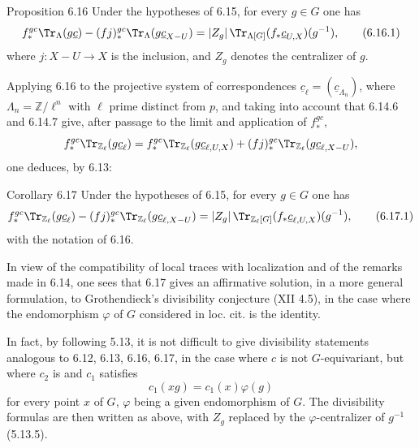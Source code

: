 \begin{statement}{Proposition 6.16}
Under the hypotheses of 6.15, for every $g\in G$ one has
\begin{equation}
f_*^{gc}\Tr_{\Lambda}(g\underline c)
-(fj)_*^{gc}\Tr_{\Lambda}(g\underline c_{X-U})
=
|Z_g|\,\Tr_{\Lambda[G]}(f_*\underline c_{U,X})(g^{-1}),
\tag{6.16.1}
\end{equation}
where $j:X-U\to X$ is the inclusion, and $Z_g$ denotes the centralizer of $g$.
\end{statement}

Applying 6.16 to the projective system of correspondences $\underline c_{\ell}=(\underline c_{\Lambda_n})$, where $\Lambda_n=\mathbb Z/\ell^n$ with $\ell$ prime distinct from $p$, and taking into account that 6.14.6 and 6.14.7 give, after passage to the limit and application of $f_*^{gc}$,
\[
f_*^{gc}\Tr_{\mathbb Z_{\ell}}(g\underline c_{\ell})
=
f_*^{gc}\Tr_{\mathbb Z_{\ell}}(g\underline c_{\ell,U,X})
+(fj)_*^{gc}\Tr_{\mathbb Z_{\ell}}(g\underline c_{\ell,X-U}),
\]
one deduces, by 6.13:

\begin{statement}{Corollary 6.17}
Under the hypotheses of 6.15, for every $g\in G$ one has
\begin{equation}
f_*^{gc}\Tr_{\mathbb Z_{\ell}}(g\underline c_{\ell})
-(fj)_*^{gc}\Tr_{\mathbb Z_{\ell}}(g\underline c_{\ell,X-U})
=
|Z_g|\,\Tr_{\mathbb Z_{\ell}[G]}(f_*\underline c_{\ell,U,X})(g^{-1}),
\tag{6.17.1}
\end{equation}
with the notation of 6.16.
\end{statement}

In view of the compatibility of local traces with localization and of the remarks made in 6.14, one sees that 6.17 gives an affirmative solution, in a more general formulation, to Grothendieck's divisibility conjecture (XII 4.5), in the case where the endomorphism $\varphi$ of $G$ considered in loc. cit. is the identity.

In fact, by following 5.13, it is not difficult to give divisibility statements analogous to 6.12, 6.13, 6.16, 6.17, in the case where $c$ is not $G$-equivariant, but where $c_2$ is and $c_1$ satisfies
\[
c_1(xg)=c_1(x)\varphi(g)
\]
for every point $x$ of $G$, $\varphi$ being a given endomorphism of $G$. The divisibility formulas are then written as above, with $Z_g$ replaced by the $\varphi$-centralizer of $g^{-1}$ (5.13.5).

